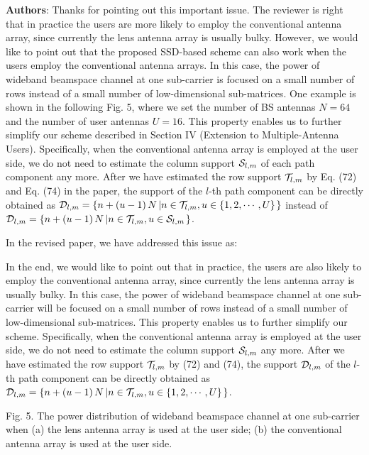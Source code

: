 \documentclass[a4paper,12pt]{article}
\begin{document}
{\color{blue} \textbf{Authors}: Thanks for pointing out this important issue. The reviewer is right that in practice the users are more likely to employ the conventional antenna array, since currently the lens antenna array is usually bulky. However, we would like to point out that the proposed SSD-based scheme can also work when the users employ the conventional antenna arrays. In this case, the power of wideband beamspace channel at one sub-carrier is focused on a small number of rows instead of a small number of low-dimensional sub-matrices. One example is shown in the following Fig. 5, where we set the number of BS antennas ${N = 64}$ and the number of user antennas ${U = 16}$. This property enables us to further simplify our scheme described in Section IV (Extension to Multiple-Antenna Users). Specifically, when the conventional antenna array is employed at the user side, we do not need to estimate the column support ${{{{\cal S}_{l,m}}}}$ of each path component any more. After we have estimated the row support ${{{{\cal T}_{l,m}}}}$ by Eq. (72) and Eq. (74) in the paper, the support of the ${l}$-th path component can be directly obtained as ${{{\cal D}_{l,m}} = \left\{ {n + \left( {u - 1} \right)N\left| {n \in {{\cal T}_{l,m}},u \in \left\{ {1,2, \cdots ,U} \right\}} \right.} \right\}}$ instead of ${{\cal D}_{l,m}} = \left\{ {n + \left( {u - 1} \right)N\left| {n \in {{\cal T}_{l,m}},u \in {{\cal S}_{l,m}}} \right.} \right\}$.





In the revised paper, we have addressed this issue as:
\begin{framed}
{\color{red} In the end, we would like to point out that in practice, the users are also likely to employ the conventional antenna array, since currently the lens antenna array is usually bulky. In this case, the power of wideband beamspace channel at one sub-carrier will be focused on a small number of rows instead of a small number of low-dimensional sub-matrices. This property enables us to further simplify our scheme. Specifically, when the conventional antenna array is employed at the user side, we do not need to estimate the column support ${{{{\cal S}_{l,m}}}}$ any more. After we have estimated the row support ${{{{\cal T}_{l,m}}}}$ by (72) and (74), the support ${{\cal D}_{l,m}}$ of the ${l}$-th path component can be directly obtained as ${{\cal D}_{l,m}} = \left\{ {n + \left( {u - 1} \right)N\left| {n \in {{\cal T}_{l,m}},u \in \left\{ {1,2, \cdots ,U} \right\}} \right.} \right\}$.}
\end{framed}

Fig. 5. The power distribution of wideband beamspace channel at one sub-carrier when (a) the lens antenna array is used at the user side; (b) the conventional antenna array is used at the user side.


}
\end{document}
